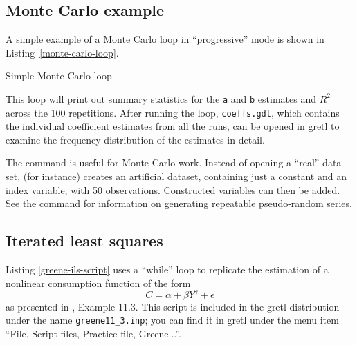 \subsection{Monte Carlo example}
\label{loop-mc-example}

A simple example of a Monte Carlo loop in ``progressive'' mode is
shown in Listing~\ref{monte-carlo-loop}.

\begin{script}[htbp]
  \caption{Simple Monte Carlo loop}
  \label{monte-carlo-loop}
\end{script}

This loop will print out summary statistics for the \texttt{a} and
\texttt{b} estimates and
$R^2$ across the 100 repetitions.  After running the loop,
\verb+coeffs.gdt+, which contains the individual coefficient estimates
from all the runs, can be opened in gretl to examine the frequency
distribution of the estimates in detail.

The  command is useful for Monte Carlo work.  Instead of
opening a ``real'' data set,  (for instance) creates
an artificial dataset, containing just a constant and an index
variable, with 50 observations. Constructed variables can then be
added.  See the  command for information on generating
repeatable pseudo-random series.

\subsection{Iterated least squares}
\label{loop-ils-examples}

Listing \ref{greene-ils-script} uses a ``while'' loop to replicate the
estimation of a nonlinear consumption function of the form
\[ C = \alpha + \beta Y^{\gamma} + \epsilon \]
as presented in \cite{greene00}, Example 11.3.  This script is included
in the gretl distribution under the name \verb+greene11_3.inp+;
you can find it in gretl under the menu item ``File, Script files,
Practice file, Greene...''.

